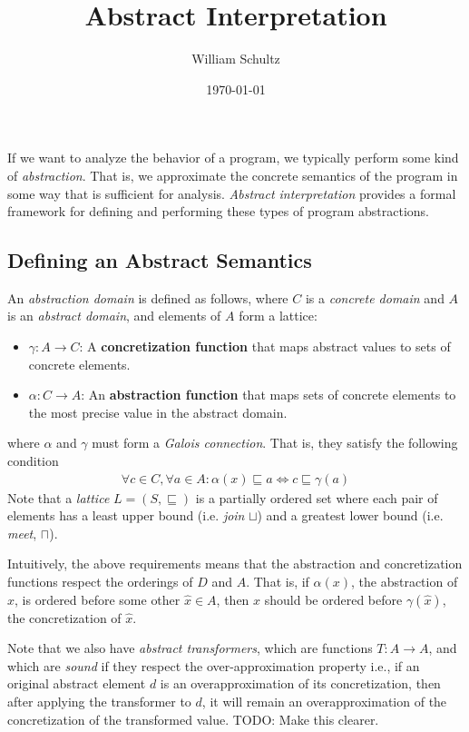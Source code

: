 \documentclass[10pt]{article}
\begin{document}
\title{Abstract Interpretation}
\author{William Schultz}
\date{\today}

\maketitle


If we want to analyze the behavior of a program, we typically perform some kind of \textit{abstraction}. That is, we approximate the concrete semantics of the program in some way that is sufficient for analysis. \textit{Abstract interpretation} provides a formal framework for defining and performing these types of program abstractions.

\subsection*{Defining an Abstract Semantics}

An \textit{abstraction domain} is defined as follows, where $C$ is a \textit{concrete domain} and $A$ is an \textit{abstract domain}, and elements of $A$ form a lattice:
\begin{itemize}
    \item $\gamma : A \rightarrow C$: A \textbf{concretization function} that maps abstract values to sets of concrete elements.
    \item $\alpha : C \rightarrow A$: An \textbf{abstraction function} that maps sets of concrete elements to the most precise value in the abstract domain. 
\end{itemize}
where $\alpha$ and $\gamma$ must form a \textit{Galois connection}. That is, they satisfy the following condition
\begin{align*}
    \forall c \in C, \forall a \in A : \alpha(x) \sqsubseteq a \Leftrightarrow c \sqsubseteq \gamma(a) 
\end{align*} 
Note that a \textit{lattice} $L=(S,\sqsubseteq)$ is a partially ordered set where each pair of elements has a least upper bound (i.e. \textit{join} $\sqcup$) and a greatest lower bound (i.e. \textit{meet}, $\sqcap$).

Intuitively, the above requirements means that the abstraction and concretization functions respect the orderings of $D$ and $A$. That is, if $\alpha(x)$, the abstraction of $x$, is ordered before some other $\hat{x} \in A$, then $x$ should be ordered before $\gamma(\hat{x})$, the concretization of $\hat{x}$.

Note that we also have \textit{abstract transformers}, which are functions $T: A \rightarrow A$, and which are \textit{sound} if they respect the over-approximation property i.e., if an original abstract element $d$ is an overapproximation of its concretization, then after applying the transformer to $d$, it will remain an overapproximation of the concretization of the transformed value. TODO: Make this clearer. 
\end{document}
